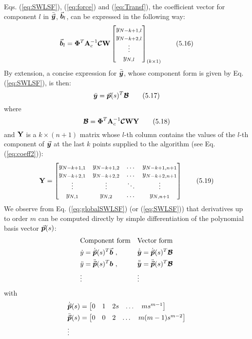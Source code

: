 Eqs. (\ref{eq:SWLSF}), (\ref{eq:force}) and (\ref{eq:Transf}), the coefficient 
vector
for component $l$ in $\bar{\vec{\bm{y}}}$, $\vec{\bm{b}}_l$, 
can be expressed in the 
following way:
\begin{equation}
	\vec{\bm{b}}_l = 
	\mathbf{\Phi}^T\mathbf{A}_c^{-1}\bm{\mathcal{C}}\mathbf{W}\begin{bmatrix}
		y_{N-k+1,l} \\ y_{N-k+2,l}\\ \vdots \\ y_{N,l}
	\end{bmatrix}_{(k\times 1)}
	\tag{5.16}\label{eq:coeff2}
\end{equation}
By extension, a concise expression for $\bar{\vec{\bm{y}}}$, whose component form 
is given by Eq. (\ref{eq:SWLSF}), is then:
\begin{equation}
	\bar{\bm{y}}=\vec{\bm{p}}(s)^T\bm{\mathcal{B}}
	\tag{5.17}\label{eq:globalSWLSF}
\end{equation}
where
\begin{equation}
	\bm{\mathcal{B}}=\mathbf{\Phi}^T\mathbf{A}_c^{-1}\bm{\mathcal{C}}\mathbf{W}\mathbf{Y}
	\tag{5.18}\label{eq:Bmatr}
\end{equation}
and $\mathbf{Y}$ is a $k\times(n+1)$ matrix whose $l$-th column contains
the values of the $l$-th component of $\vec{\bm{y}}$ at the last $k$ points
supplied to the algorithm (see Eq. (\ref{eq:coeff2})):
\begin{equation}
	\mathbf{Y}=\begin{bmatrix}
		y_{N-k+1,1} & y_{N-k+1,2} & \dots & y_{N-k+1,n+1}\\
		y_{N-k+2,1} & y_{N-k+2,2} & \dots & y_{N-k+2,n+1}\\
		\vdots      & \vdots      & \ddots & \vdots\\
		y_{N,1} & y_{N,2} & \dots & y_{N,n+1}\\
	\end{bmatrix}
	\tag{5.19}\label{eq:Y}
\end{equation}
We observe from Eq. (\ref{eq:globalSWLSF}) (or (\ref{eq:SWLSF})) that 
derivatives up 
to order $m$ can be computed directly by simple differentiation of the 
polynomial basis vector $\vec{\bm{p}}(s)$:
\begin{align}
	& \text{Component form} && \text{Vector form}\nonumber\\
	&\dot{y} = \dot{\vec{\bm{p}}}(s)^T\vec{\bm{b}}\ , &&
	\dot{\bar{\bm{y}}}= \dot{\vec{\bm{p}}}(s)^T\bm{\mathcal{B}}\nonumber\\
	&\ddot{y} = \ddot{\vec{\bm{p}}}(s)^T\bm{b}\ , &&
	\ddot{\bar{\bm{y}}}= \ddot{\vec{\bm{p}}}(s)^T\bm{\mathcal{B}}\nonumber\\
	&\vdots && \vdots\nonumber
\end{align}
with 
\begin{align*}
	&\dot{\vec{\bm{p}}}(s)=\begin{bmatrix}
		0 & 1 & 2s & \dots & ms^{m-1}
	\end{bmatrix}\\
	&\ddot{\vec{\bm{p}}}(s)=\begin{bmatrix}
		0 & 0 & 2 & \dots & m(m-1)s^{m-2}
	\end{bmatrix}\\
	&\vdots
\end{align*}


